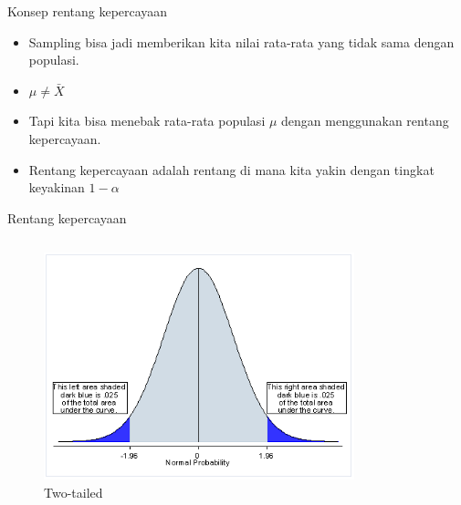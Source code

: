 \documentclass[
  ignorenonframetext,
]{beamer}
\begin{document}
\begin{frame}{Konsep rentang kepercayaan}
\label{konsep-rentang-kepercayaan}
\begin{itemize}
\item
  Sampling bisa jadi memberikan kita nilai rata-rata yang tidak sama
  dengan populasi.
\item
  \(\mu \neq \bar{X}\)
\item
  Tapi kita bisa menebak rata-rata populasi \(\mu\) dengan menggunakan
  rentang kepercayaan.
\item
  Rentang kepercayaan adalah rentang di mana kita yakin dengan tingkat
  keyakinan \(1-\alpha\)
\end{itemize}
\end{frame}

\begin{frame}{Rentang kepercayaan}
\label{rentang-kepercayaan}
\begin{columns}[T]
\begin{column}{0.47\textwidth}
\begin{figure}[H]

{\centering \includegraphics{pvalue1.gif}

}

\caption{Two-tailed}

\end{figure}%
\end{column}

\begin{column}{0.47\textwidth}
\begin{figure}[H]


\end{figure}
\end{column}
\end{columns}
\end{frame}
\end{document}
